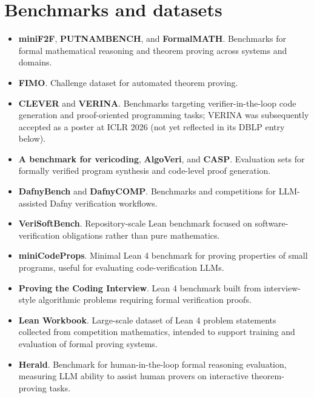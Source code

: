 \documentclass[natbib=false,acmsmall,nonacm,11pt]{acmart}
\begin{document}
\section{Benchmarks and datasets}\label{sec:benchmarks-datasets}
\begin{itemize}
\item \textbf{miniF2F}, \textbf{PUTNAMBENCH}, and \textbf{FormalMATH}. Benchmarks for formal mathematical reasoning and theorem proving across systems and domains.~\cite{DBLP:conf/iclr/ZhengHP22,DBLP:conf/nips/TsoukalasLJXDJT24,DBLP:journals/corr/abs-2505-02735}
\item \textbf{FIMO}. Challenge dataset for automated theorem proving.~\cite{DBLP:journals/corr/abs-2309-04295}
\item \textbf{CLEVER} and \textbf{VERINA}. Benchmarks targeting verifier-in-the-loop code generation and proof-oriented programming tasks; VERINA was subsequently accepted as a poster at ICLR 2026 (not yet reflected in its DBLP entry below).~\cite{DBLP:journals/corr/abs-2505-13938,DBLP:journals/corr/abs-2505-23135}
\item \textbf{A benchmark for vericoding}, \textbf{AlgoVeri}, and \textbf{CASP}. Evaluation sets for formally verified program synthesis and code-level proof generation.~\cite{DBLP:journals/corr/abs-2509-22908,DBLP:journals/corr/abs-2602-09464,DBLP:conf/vecos/HertzbergSKL25}
\item \textbf{DafnyBench} and \textbf{DafnyCOMP}. Benchmarks and competitions for LLM-assisted Dafny verification workflows.~\cite{DBLP:journals/tmlr/LoughridgeSACS025,DBLP:journals/corr/abs-2509-23061}
\item \textbf{VeriSoftBench}. Repository-scale Lean benchmark focused on software-verification obligations rather than pure mathematics.~\cite{DBLP:journals/corr/abs-2602-18307}
\item \textbf{miniCodeProps}. Minimal Lean 4 benchmark for proving properties of small programs, useful for evaluating code-verification LLMs.~\cite{DBLP:journals/corr/abs-2406-11915}
\item \textbf{Proving the Coding Interview}. Lean 4 benchmark built from interview-style algorithmic problems requiring formal verification proofs.~\cite{DBLP:journals/corr/abs-2502-05714}
\item \textbf{Lean Workbook}. Large-scale dataset of Lean 4 problem statements collected from competition mathematics, intended to support training and evaluation of formal proving systems.~\cite{DBLP:journals/corr/abs-2406-03847}
\item \textbf{Herald}. Benchmark for human-in-the-loop formal reasoning evaluation, measuring LLM ability to assist human provers on interactive theorem-proving tasks.~\cite{DBLP:journals/corr/abs-2410-10878}

\end{itemize}
\end{document}
